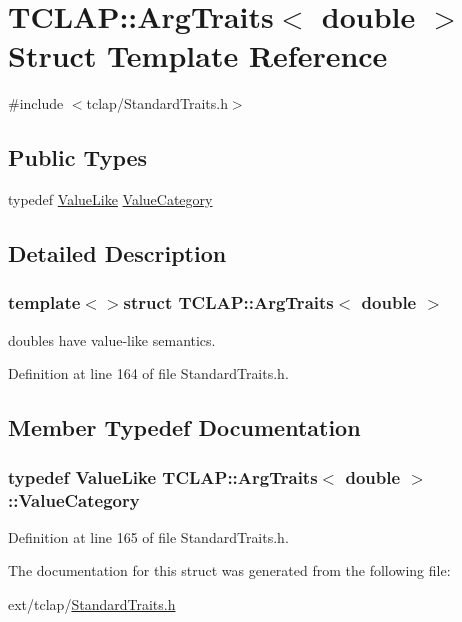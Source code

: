 \hypertarget{struct_t_c_l_a_p_1_1_arg_traits_3_01double_01_4}{}\section{T\+C\+L\+A\+P\+:\+:Arg\+Traits$<$ double $>$ Struct Template Reference}
\label{struct_t_c_l_a_p_1_1_arg_traits_3_01double_01_4}


{\ttfamily \#include $<$tclap/\+Standard\+Traits.\+h$>$}

\subsection*{Public Types}
\begin{DoxyCompactItemize}
\item 
typedef \hyperlink{struct_t_c_l_a_p_1_1_value_like}{Value\+Like} \hyperlink{struct_t_c_l_a_p_1_1_arg_traits_3_01double_01_4_a06ac5f8ebfcbc537e9ce57b96836dd3d}{Value\+Category}
\end{DoxyCompactItemize}


\subsection{Detailed Description}
\subsubsection*{template$<$$>$struct T\+C\+L\+A\+P\+::\+Arg\+Traits$<$ double $>$}

doubles have value-\/like semantics. 

Definition at line 164 of file Standard\+Traits.\+h.



\subsection{Member Typedef Documentation}
\hypertarget{struct_t_c_l_a_p_1_1_arg_traits_3_01double_01_4_a06ac5f8ebfcbc537e9ce57b96836dd3d}{}
\subsubsection[{Value\+Category}]{\setlength{\rightskip}{0pt plus 5cm}typedef {\bf Value\+Like} {\bf T\+C\+L\+A\+P\+::\+Arg\+Traits}$<$ double $>$\+::{\bf Value\+Category}}\label{struct_t_c_l_a_p_1_1_arg_traits_3_01double_01_4_a06ac5f8ebfcbc537e9ce57b96836dd3d}


Definition at line 165 of file Standard\+Traits.\+h.



The documentation for this struct was generated from the following file\+:\begin{DoxyCompactItemize}
\item 
ext/tclap/\hyperlink{_standard_traits_8h}{Standard\+Traits.\+h}\end{DoxyCompactItemize}
